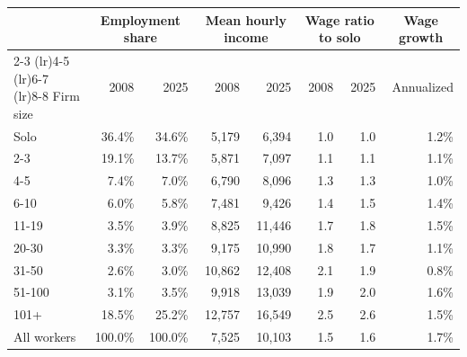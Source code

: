 \begin{tabular}{lrrrrrrr}
\toprule
    & \multicolumn{2}{c}{Employment share} & \multicolumn{2}{c}{Mean hourly income} & \multicolumn{2}{c}{Wage ratio to solo} & \multicolumn{1}{c}{Wage growth} \\
    \cmidrule(lr){2-3} \cmidrule(lr){4-5} \cmidrule(lr){6-7} \cmidrule(lr){8-8}
    Firm size & 2008 & 2025 & 2008 & 2025 & 2008 & 2025 & Annualized \\
    \midrule
Solo & 36.4\% & 34.6\% & 5,179 & 6,394 & 1.0 & 1.0 & 1.2\% \\
2-3 & 19.1\% & 13.7\% & 5,871 & 7,097 & 1.1 & 1.1 & 1.1\% \\
4-5 & 7.4\% & 7.0\% & 6,790 & 8,096 & 1.3 & 1.3 & 1.0\% \\
6-10 & 6.0\% & 5.8\% & 7,481 & 9,426 & 1.4 & 1.5 & 1.4\% \\
11-19 & 3.5\% & 3.9\% & 8,825 & 11,446 & 1.7 & 1.8 & 1.5\% \\
20-30 & 3.3\% & 3.3\% & 9,175 & 10,990 & 1.8 & 1.7 & 1.1\% \\
31-50 & 2.6\% & 3.0\% & 10,862 & 12,408 & 2.1 & 1.9 & 0.8\% \\
51-100 & 3.1\% & 3.5\% & 9,918 & 13,039 & 1.9 & 2.0 & 1.6\% \\
101+ & 18.5\% & 25.2\% & 12,757 & 16,549 & 2.5 & 2.6 & 1.5\% \\
\addlinespace
    All workers & 100.0\% & 100.0\% & 7,525 & 10,103 & 1.5 & 1.6 & 1.7\%\\
\bottomrule\end{tabular}
